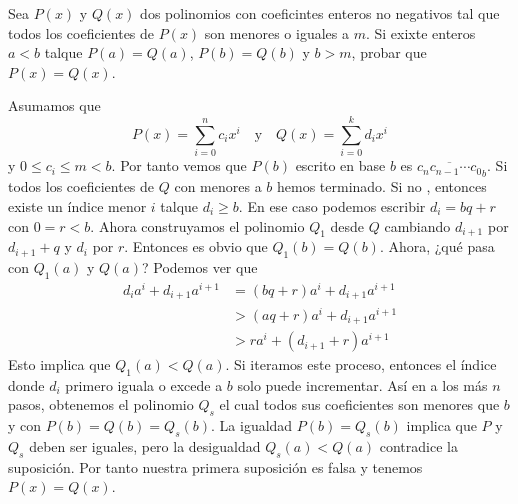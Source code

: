 \begin{example}
    Sea $P(x)$ y $Q(x)$ dos polinomios con coeficintes enteros no negativos tal que todos los coeficientes de $P(x)$ son menores o iguales a $m$.
    Si exixte enteros $a < b$ talque $P(a) = Q(a)$, $P(b) = Q(b)$ y $b > m$, probar que $P(x) = Q(x)$.
\end{example}
\begin{solution}
    Asumamos que
    \[
        P(x) = \sum_{i = 0}^{n} c_i x^i \quad \text{y} \quad Q(x) = \sum_{i = 0}^{k} d_i x^i
    \]
    y $0 \leq c_i \leq m < b$.
    Por tanto vemos que $P(b)$ escrito en base $b$ es $\overline{c_n c_{n -1} \cdots c_0}_b$.
    Si todos los coeficientes de $Q$ con menores a $b$ hemos terminado.
    Si no , entonces existe un índice menor $i$ talque $d_i \geq b$.
    En ese caso podemos escribir $d_i = bq + r$ con $0 = r < b$.
    Ahora construyamos el polinomio $Q_1$ desde $Q$ cambiando $d_{i + 1}$ por $d_{i + 1} + q$ y $d_i$ por $r$.
    Entonces es obvio que $Q_1(b) = Q(b)$.
    Ahora, ¿qué pasa con $Q_1(a)$ y $Q(a)$?
    Podemos ver que
    \begin{align*}
        d_i a^i + d_{i + 1} a^{i + 1} &= (bq + r) a^i + d_{i + 1} a^{i + 1}\\
        &> (aq + r) a^i + d_{i + 1} a^{i + 1}\\
        &> r a^i + (d_{i + 1} + r) a^{i + 1}
    \end{align*}
    Esto implica que $Q_1(a) < Q(a)$.
    Si iteramos este proceso, entonces el índice donde $d_i$ primero iguala o excede a $b$ solo puede incrementar.
    Así en a los más $n$ pasos, obtenemos el polinomio $Q_s$ el cual todos sus coeficientes son menores que $b$ y con $P(b) = Q(b) = Q_s(b)$.
    La igualdad $P(b) = Q_s(b)$ implica que $P$ y $Q_s$ deben ser iguales, pero la desigualdad $Q_s (a) < Q(a)$ contradice la suposición.
    Por tanto nuestra primera suposición es falsa y tenemos $P(x) = Q(x)$.
\end{solution}

